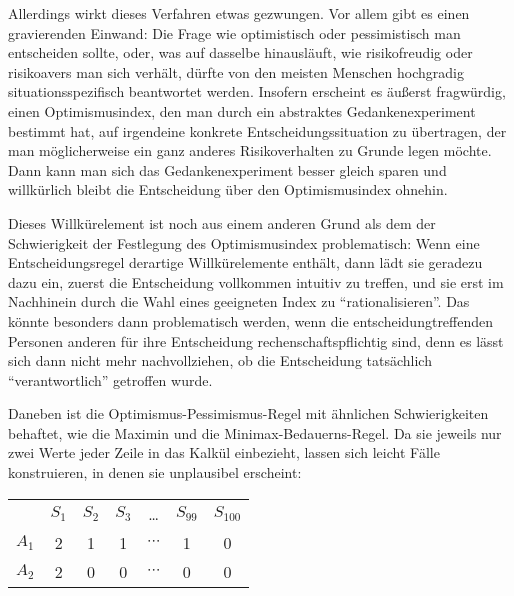 Allerdings wirkt dieses Verfahren etwas gezwungen. Vor allem gibt es einen
gravierenden Einwand: Die Frage wie optimistisch oder pessimistisch man
entscheiden sollte, oder, was auf dasselbe hinausläuft, wie risikofreudig oder
risikoavers man sich verhält, dürfte von den meisten Menschen hochgradig
situationsspezifisch beantwortet werden. Insofern erscheint es äußerst
fragwürdig, einen Optimismusindex, den man durch ein abstraktes
Gedankenexperiment bestimmt hat, auf irgendeine konkrete Entscheidungssituation
zu übertragen, der man möglicherweise ein ganz anderes Risikoverhalten zu Grunde
legen möchte. Dann kann man sich das Gedankenexperiment besser gleich sparen und
willkürlich bleibt die Entscheidung über den Optimismusindex ohnehin.

Dieses Willkürelement ist noch aus einem anderen Grund als dem der Schwierigkeit
der Festlegung des Optimismusindex problematisch:
Wenn eine Entscheidungsregel derartige Willkürelemente enthält, dann lädt sie
geradezu dazu ein, zuerst die Entscheidung vollkommen intuitiv zu treffen, und
sie erst im Nachhinein durch die Wahl eines geeigneten Index zu
"`rationalisieren"'. Das könnte besonders dann problematisch werden, wenn die
entscheidungtreffenden Personen anderen für ihre Entscheidung
rechenschaftspflichtig sind, denn es lässt sich dann nicht mehr nachvollziehen,
ob die Entscheidung tatsächlich "`verantwortlich"' getroffen wurde.

Daneben ist die Optimismus-Pessimismus-Regel mit ähnlichen Schwierigkeiten
behaftet, wie die Maximin und die Minimax-Bedauerns-Regel. 
Da sie jeweils nur
zwei Werte jeder Zeile in das Kalkül einbezieht, lassen sich leicht Fälle
konstruieren, in denen sie unplausibel erscheint:
\begin{center}
\begin{tabular}{c|c|c|c|c|c|c|}
\multicolumn{1}{c}{ } & \multicolumn{1}{c}{$S_1$} &
\multicolumn{1}{c}{$S_2$} & \multicolumn{1}{c}{$S_3$} & 
\multicolumn{1}{c}{\ldots} & 
\multicolumn{1}{c}{$S_{99}$} & \multicolumn{1}{c}{$S_{100}$} \\ \cline{2-7}
$A_1$ & 2 & 1 & 1 & $\cdots$ & 1 & 0 \\ \cline{2-7}
$A_2$ & 2 & 0 & 0 & $\cdots$ & 0 & 0 \\ \cline{2-7}
\end{tabular}
\end{center}


